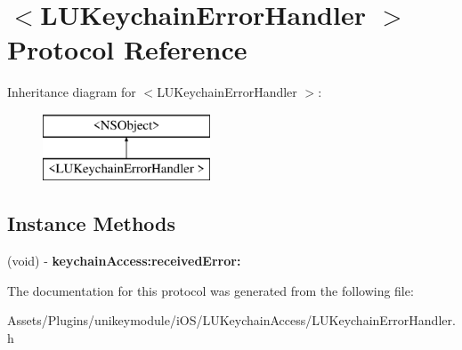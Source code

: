\hypertarget{protocol_l_u_keychain_error_handler_01-p}{}\section{$<$L\+U\+Keychain\+Error\+Handler $>$ Protocol Reference}
\label{protocol_l_u_keychain_error_handler_01-p}
Inheritance diagram for $<$L\+U\+Keychain\+Error\+Handler $>$\+:\begin{figure}[H]
\begin{center}
\leavevmode
\includegraphics[height=2.000000cm]{protocol_l_u_keychain_error_handler_01-p}
\end{center}
\end{figure}
\subsection*{Instance Methods}
\begin{DoxyCompactItemize}
\item 
\mbox{\label{protocol_l_u_keychain_error_handler_01-p_a57aba4a7e6d1f42dd729b333a308175b}} 
(void) -\/ {\bfseries keychain\+Access\+:received\+Error\+:}
\end{DoxyCompactItemize}


The documentation for this protocol was generated from the following file\+:\begin{DoxyCompactItemize}
\item 
Assets/\+Plugins/unikeymodule/i\+O\+S/\+L\+U\+Keychain\+Access/L\+U\+Keychain\+Error\+Handler.\+h\end{DoxyCompactItemize}
